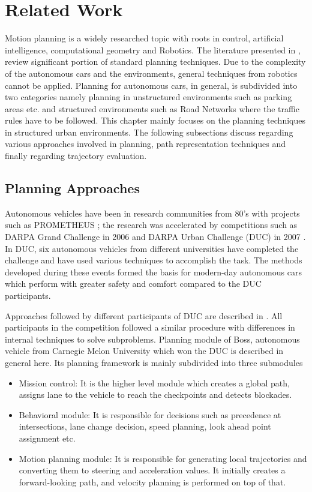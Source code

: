 \chapter{Related Work}
\label{related_work}
Motion planning is a widely researched topic with roots in control, artificial intelligence, computational geometry and Robotics. The literature presented in \cite{book_robot_motion_planning}, \cite{book_lavelle_planning} review significant portion of standard planning techniques. Due to the complexity of the autonomous cars and the environments, general techniques from robotics cannot be applied. Planning for autonomous cars, in general, is subdivided into two categories namely planning in unstructured environments such as parking areas etc. and structured environments such as Road Networks where the traffic rules have to be followed. This chapter mainly focuses on the planning techniques in structured urban environments. The following subsections discuss regarding various approaches involved in planning, path representation techniques and finally regarding trajectory evaluation. 

\section{Planning Approaches}
\label{planning_aproaches}

Autonomous vehicles have been in research communities from 80's with projects such as PROMETHEUS \cite{prometheus}; the research was accelerated by competitions such as DARPA Grand Challenge in 2006 and DARPA Urban Challenge (DUC) in 2007 \cite{darpa_urban_challenge}. In DUC, six autonomous vehicles from different universities have completed the challenge and have used various techniques to accomplish the task. The methods developed during these events formed the basis for modern-day autonomous cars which perform with greater safety and comfort compared to the DUC participants. 

Approaches followed by different participants of DUC are described in \cite{darpa_urban_challenge}. All participants in the competition followed a similar procedure with differences in internal techniques to solve subproblems. Planning module of Boss, autonomous vehicle from Carnegie Melon University which won the DUC is described in general here. Its planning framework is mainly subdivided into three submodules 

\begin{itemize}
    \item Mission control: It is the higher level module which creates a global path, assigns lane to the vehicle to reach the checkpoints and detects blockades.
	\item Behavioral module: It is responsible for decisions such as precedence at intersections, lane change decision, speed planning, look ahead point assignment etc. 
	\item Motion planning module: It is responsible for generating local trajectories and converting them to steering and acceleration values. It initially creates a forward-looking path, and velocity planning is performed on top of that. 
\end{itemize}

